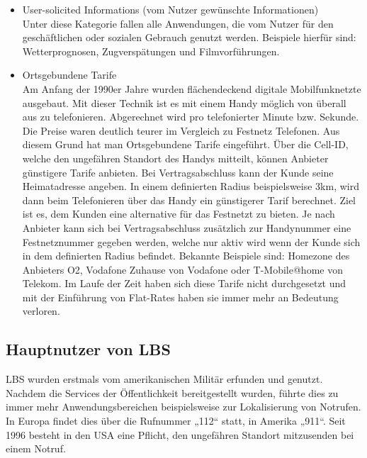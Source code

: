 \begin{itemize}
	\item User-solicited Informations (vom Nutzer gewünschte Informationen)\\
Unter diese Kategorie fallen alle Anwendungen, die vom Nutzer für den geschäftlichen oder sozialen Gebrauch genutzt werden. Beispiele hierfür sind: Wetterprognosen, Zugverspätungen und Filmvorführungen.
	\item Ortsgebundene Tarife\\
	Am Anfang der 1990er Jahre wurden flächendeckend digitale Mobilfunknetzte ausgebaut. Mit dieser Technik ist es mit einem Handy möglich von überall aus zu telefonieren. Abgerechnet wird pro telefonierter Minute bzw. Sekunde. Die Preise waren deutlich teurer im Vergleich zu Festnetz Telefonen. Aus diesem Grund hat man Ortsgebundene Tarife eingeführt. Über die Cell-ID, welche den ungefähren Standort des Handys mitteilt, können Anbieter günstigere Tarife anbieten. Bei Vertragsabschluss kann der Kunde seine Heimatadresse angeben. In einem definierten Radius beispielsweise 3km, wird dann beim Telefonieren über das Handy ein günstigerer Tarif berechnet. Ziel ist es, dem Kunden eine alternative für das Festnetzt zu bieten. Je nach Anbieter kann sich bei Vertragsabschluss zusätzlich zur Handynummer eine Festnetznummer gegeben werden, welche nur aktiv wird wenn der Kunde sich in dem definierten Radius befindet. Bekannte Beispiele sind: Homezone des Anbieters O2, Vodafone Zuhause von Vodafone oder T-Mobile@home von Telekom. Im Laufe der Zeit haben sich diese Tarife nicht durchgesetzt und mit der Einführung von Flat-Rates haben sie immer mehr an Bedeutung verloren. \cite{OrtgTarife} 
\end{itemize}


\subsection{Hauptnutzer von LBS}

LBS wurden erstmals vom amerikanischen Militär erfunden und genutzt. Nachdem die Services der Öffentlichkeit bereitgestellt wurden, führte dies zu immer mehr Anwendungsbereichen beispielsweise zur Lokalisierung von Notrufen. In Europa findet dies über die Rufnummer „112“ statt, in Amerika „911“.  Seit 1996 besteht in den USA eine Pflicht, den ungefähren Standort mitzusenden bei einem Notruf. 

